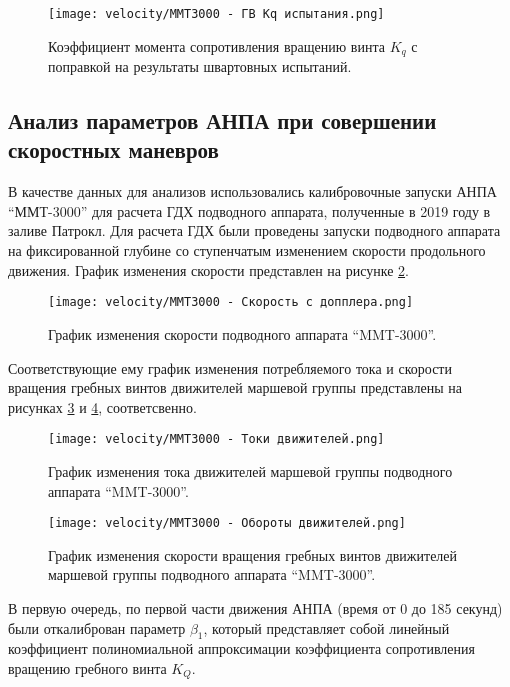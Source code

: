 \begin{figure}[ht]
    \centering
    \texttt{[image: velocity/MMT3000 - ГВ Kq испытания.png]}
    \caption{Коэффициент момента сопротивления вращению винта $K_q$ с поправкой на результаты швартовных испытаний.}
    \label{fig:mmt3000_propeller_kq_bollard}
\end{figure}

\subsection{Анализ параметров АНПА при совершении скоростных маневров}
В качестве данных для анализов использовались калибровочные запуски АНПА ``ММТ-3000'' для расчета ГДХ подводного аппарата, полученные в 2019 году в заливе Патрокл.
Для расчета ГДХ были проведены запуски подводного аппарата на фиксированной глубине со ступенчатым изменением скорости продольного движения.
График изменения скорости представлен на рисунке \ref{fig:mmt3000_velocity}.

\begin{figure}[ht]
    \centering
    \texttt{[image: velocity/MMT3000 - Скорость с допплера.png]}
    \caption{График изменения скорости подводного аппарата ``MMT-3000''.}
    \label{fig:mmt3000_velocity}
\end{figure}

Соответствующие ему график изменения потребляемого тока и скорости вращения гребных винтов движителей маршевой группы представлены на рисунках \ref{fig:mmt3000_curent} и  \ref{fig:mmt3000_rotation}, соответсвенно.

\begin{figure}[ht]
    \centering
    \texttt{[image: velocity/MMT3000 - Токи движителей.png]}
    \caption{График изменения тока движителей маршевой группы подводного аппарата ``MMT-3000''.}
    \label{fig:mmt3000_curent}
\end{figure}

\begin{figure}[ht]
    \centering
    \texttt{[image: velocity/MMT3000 - Обороты движителей.png]}
    \caption{График изменения скорости вращения гребных винтов движителей маршевой группы подводного аппарата ``MMT-3000''.}
    \label{fig:mmt3000_rotation}
\end{figure}

В первую очередь, по первой части движения АНПА (время от 0 до 185 секунд) были откалиброван параметр $\beta_1$, который представляет собой линейный коэффициент полиномиальной аппроксимации коэффициента сопротивления вращению гребного винта $K_Q$. 

